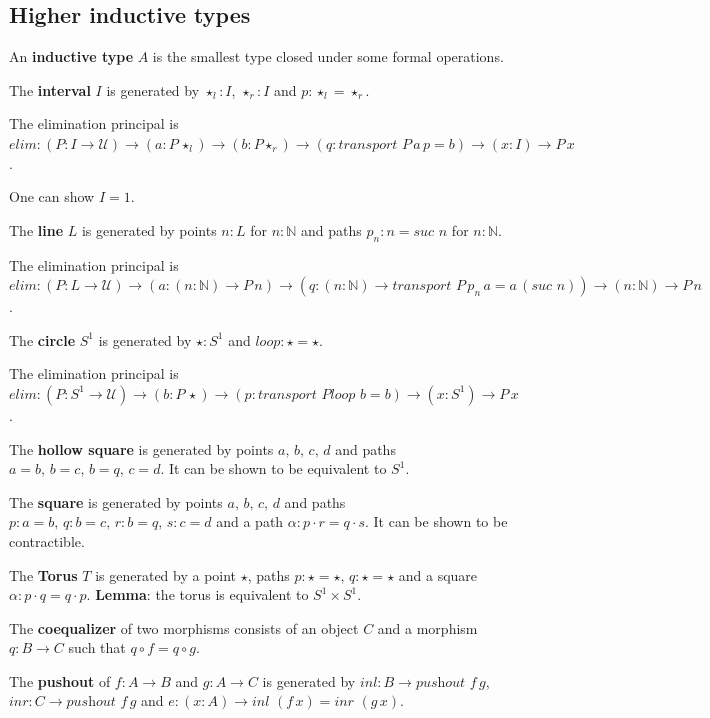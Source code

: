 \documentclass[a4paper]{article}
\begin{document}
\subsection*{Higher inductive types}

An \textbf{inductive type} $A$ is the smallest type closed under some formal operations.

The \textbf{interval} $I$ is generated by $\star_l : I$, $\star_r : I$ and $p : \star_l = \star_r$.

The elimination principal is $\textit{elim} : (P : I \to \mathcal{U}) \to (a : P \, \star_l) \to (b : P \star_r) \to (q : \textit{transport } P \, a \, p = b) \to (x : I) \to P \, x$.

One can show $I = 1$.

The \textbf{line} $L$ is generated by points $n : L$ for $n : \mathbb{N}$ and paths $p_n : n = \textit{suc } n$ for $n : \mathbb{N}$.

The elimination principal is $\textit{elim} : (P : L \to \mathcal{U}) \to (a : (n : \mathbb{N}) \to P \, n) \to (q : (n : \mathbb{N}) \to \textit{transport } P \, p_n \, a = a \, (\textit{suc } n)) \to (n : \mathbb{N}) \to P \, n$.

The \textbf{circle} $S^1$ is generated by $\star : S^1$ and $\textit{loop} : \star = \star$.

The elimination principal is $\textit{elim} : (P : S^1 \to \mathcal{U}) \to (b : P \, \star) \to (p : \textit{transport } P \textit{loop } b = b) \to (x : S^1) \to P \, x$.

The \textbf{hollow square} is generated by points $a, \, b, \, c, \, d$ and paths $a = b, \, b = c, \, b = q, \, c = d$. It can be shown to be equivalent to $S^1$.

The \textbf{square} is generated by points $a, \, b, \, c, \, d$ and paths $p : a = b, \, q : b = c, \, r : b = q, \, s : c = d$ and a path $\alpha : p \cdot r = q \cdot s$. It can be shown to be contractible.

The \textbf{Torus} $T$ is generated by a point $\star$, paths $p : \star = \star, \, q : \star = \star$ and a square $\alpha : p \cdot q = q \cdot p$. \textbf{Lemma}: the torus is equivalent to $S^1 \times S^1$.

The \textbf{coequalizer} of two morphisms consists of an object $C$ and a morphism $q : B \to C$ such that $q \circ f = q \circ g$.

The \textbf{pushout} of $f : A \to B$ and $g : A \to C$ is generated by $\textit{inl} : B \to \textit{pushout } f \, g$, $\textit{inr} : C \to \textit{pushout } f \, g$ and $e : (x : A) \to \textit{inl } (f \, x) = \textit{inr } (g \, x)$.
\end{document}
